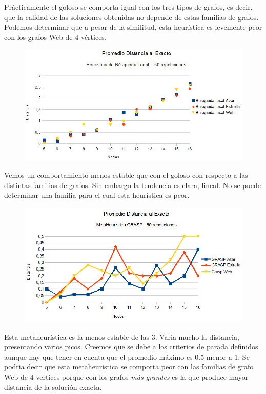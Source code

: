 \quad Prácticamente el goloso se comporta igual con los tres tipos de grafos, es decir, que la calidad de las soluciones obtenidas no depende de estas familias de grafos. Podemos determinar que a pesar de la similitud, esta heurística es levemente peor con los grafos Web de 4 vértices.

\quad

\begin{figure}[H]
	\centering
	\includegraphics[scale=0.6]{distancia-BLocal.png}
\end{figure}

\quad Vemos un comportamiento menos estable que con el goloso con respecto a las distintas familias de grafos. Sin embargo la tendencia es clara, lineal. No se puede determinar una familia para el cual esta heurística es peor.

\begin{figure}[H]
	\centering
	\includegraphics[scale=0.6]{distancia-GRASP.png}
\end{figure}

\quad Esta metaheurística es la menos estable de las 3. Varia mucho la distancia, presentando varios picos. Creemos que se debe a los criterios de parada definidos aunque hay que tener en cuenta que el promedio máximo es 0.5 menor a 1. Se podria decir que esta metaheuristica se comporta peor con las familias de grafo Web de 4 vertices porque con los grafos \textit{más grandes} es la que produce mayor distancia de la solución exacta.

